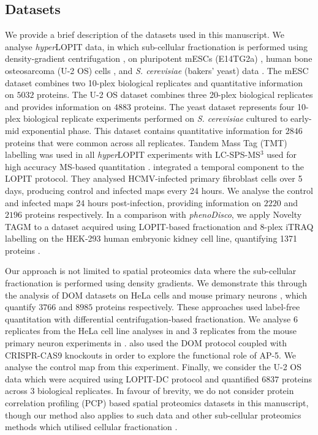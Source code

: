 \documentclass[12pt,english]{article}
\begin{document}
\subsection{Datasets}
We provide a brief description of the datasets used in this manuscript. We analyse \textit{hyper}LOPIT data, in which sub-cellular fractionation is performed using density-gradient centrifugation \citep{Dunkley:2004, Dunkley:2006, Mulvey:2017}, on pluripotent mESCs (E14TG2a) \citep{hyper}, human bone osteosarcoma (U-2 OS) cells \citep{Thul:2017, DC:2018}, and \textit{S. cerevisiae} (bakers' yeast) data \citep{Nightingale::2019}. The mESC dataset combines two 10-plex biological replicates and quantitative information on $5032$ proteins. The U-2 OS dataset combines three 20-plex biological replicates and provides information on $4883$ proteins. The yeast dataset represents four 10-plex biological replicate experiments performed on \textit{S. cerevisiae} cultured to early-mid exponential phase. This dataset contains quantitative information for $2846$ proteins that were common across all replicates. Tandem Mass Tag (TMT) \citep{Thompson:2003} labelling was used in all \textit{hyper}LOPIT experiments with LC-SPS-MS$^{3}$ used for high accuracy MS-based quantitation \citep{Ting:2011, Mcalister::2014}. \cite{Jean_Beltran:2016} integrated a temporal component to the LOPIT protocol. They analysed HCMV-infected primary fibroblast cells over 5 days, producing control and infected maps every 24 hours. We analyse the control and infected maps 24 hours post-infection, providing information on $2220$ and $2196$ proteins respectively. In a comparison with \textit{phenoDisco}, we apply Novelty TAGM to a dataset acquired using LOPIT-based fractionation and 8-plex iTRAQ labelling on the HEK-293 human embryonic kidney cell line, quantifying 1371 proteins \citep{Breckels:2013}.

Our approach is not limited to spatial proteomics data where the sub-cellular fractionation is performed using density gradients. We demonstrate this through the analysis of DOM datasets on HeLa cells and mouse primary neurons \citep{Itzhak:2016, Itzhak::2017}, which quantify $3766$ and $8985$ proteins respectively. These approaches used label-free quantitation with differential centrifugation-based fractionation. We analyse $6$ replicates from the HeLa cell line analyses in \cite{Itzhak:2016} and $3$ replicates from the mouse primary neuron experiments in \cite{Itzhak::2017}. \cite{Hirst:2018} also used the DOM protocol coupled with CRISPR-CAS9 knockouts in order to explore the functional role of AP-5. We analyse the control map from this experiment. Finally, we consider the U-2 OS data which were acquired using LOPIT-DC protocol \citep{DC:2018} and quantified $6837$ proteins across $3$ biological replicates. In favour of brevity, we do not consider protein correlation profiling (PCP) based spatial proteomics datasets in this manuscript, though our method also applies to such data \citep{Foster:2006, kristensen:2012, kristensen:2014} and other sub-cellular proteomics methods which utilised cellular fractionation \citep{Orre:2019}.
\end{document}
